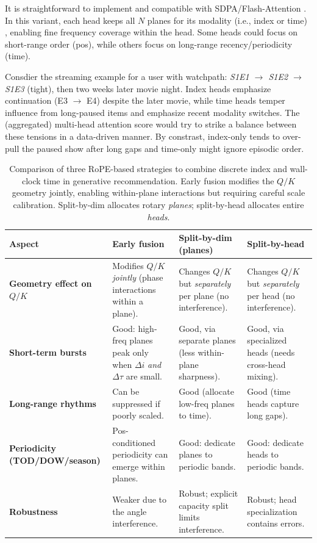 \documentclass[sigconf]{acmart}
\begin{document}
It is straightforward to implement and compatible with SDPA/Flash-Attention \cite{Dao2022FlashAttentionFA, Dao2023FlashAttention2FA}. In this variant, each head keeps all $N$ planes for its modality (i.e., index or time) , enabling fine frequency coverage within the head. Some heads could focus on short-range order (pos), while others focus on long-range recency/periodicity (time). 

Consdier the streaming example for a user with watchpath: \emph{S1E1 $\rightarrow$ S1E2 $\rightarrow$ S1E3} (tight), then two weeks later movie night.  
Index heads emphasize continuation (E3 $\rightarrow$ E4) despite the later movie, while time heads temper influence from long-paused items and emphasize recent modality switches. The (aggregated) multi-head attention score would try to strike a balance between these tensions in a data-driven manner. By constrast, index-only tends to over-pull the paused show after long gaps and time-only might ignore episodic order. 





\begin{table}[t]
\centering
\small
\renewcommand{\arraystretch}{1.15}
\begin{tabularx}{\textwidth}{@{}lXXX@{}}
\toprule
\textbf{Aspect} &
\textbf{Early fusion} &
\textbf{Split-by-dim (planes)} &
\textbf{Split-by-head} \\
\midrule

\textbf{Geometry effect on $Q/K$} &
Modifies $Q/K$ \emph{jointly} (phase interactions within a plane). &
Changes $Q/K$ but \emph{separately} per plane (no interference). &
Changes $Q/K$ but \emph{separately} per head (no interference). \\
\addlinespace
\textbf{Short-term bursts} &
Good: high-freq planes peak only when $\Delta i$ \emph{and} $\Delta\tau$ are small. &
Good, via separate planes (less within-plane sharpness). &
Good, via specialized heads (needs cross-head mixing). \\
\addlinespace
\textbf{Long-range rhythms} &
Can be suppressed if poorly scaled. &
Good (allocate low-freq planes to time). &
Good (time heads capture long gaps). \\
\addlinespace
\textbf{Periodicity (TOD/DOW/season)} &
Pos-conditioned periodicity can emerge within planes. &
Good: dedicate planes to periodic bands. &
Good: dedicate heads to periodic bands. \\
\addlinespace
\textbf{Robustness} &
Weaker due to the angle interference. &
Robust; explicit capacity split limits interference. &
Robust; head specialization contains errors. \\
\bottomrule
\end{tabularx}
\caption{Comparison of three RoPE-based strategies to combine discrete index and wall-clock time in generative recommendation. Early fusion modifies the $Q/K$ geometry jointly, enabling within-plane interactions but requiring careful scale calibration. Split-by-dim allocates rotary \emph{planes}; split-by-head allocates entire \emph{heads}.}
\label{tab:rope-methods}
\end{table}
\end{document}
